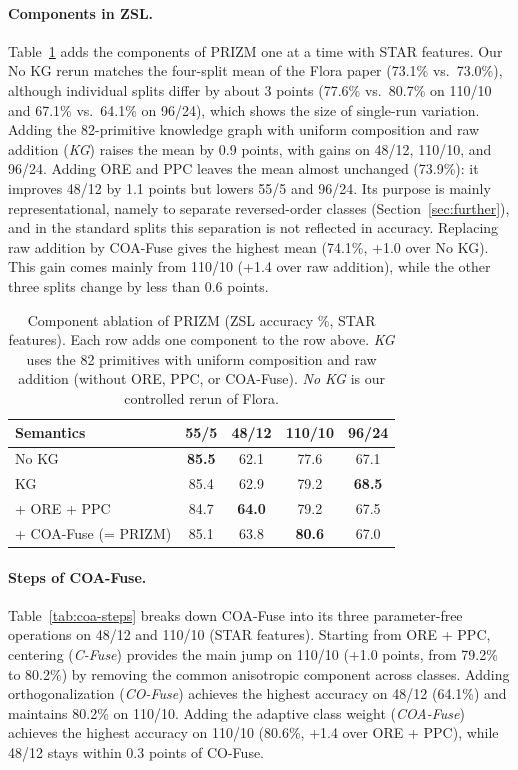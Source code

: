 \documentclass[11pt]{article}
\begin{document}
\paragraph{Components in ZSL.}
Table~\ref{tab:components} adds the components of PRIZM one at a time with STAR features. Our No KG rerun matches the four-split mean of the Flora paper (73.1\% vs.\ 73.0\%), although individual splits differ by about 3 points (77.6\% vs.\ 80.7\% on 110/10 and 67.1\% vs.\ 64.1\% on 96/24), which shows the size of single-run variation. Adding the 82-primitive knowledge graph with uniform composition and raw addition (\emph{KG}) raises the mean by 0.9 points, with gains on 48/12, 110/10, and 96/24. Adding ORE and PPC leaves the mean almost unchanged (73.9\%): it improves 48/12 by 1.1 points but lowers 55/5 and 96/24. Its purpose is mainly representational, namely to separate reversed-order classes (Section~\ref{sec:further}), and in the standard splits this separation is not reflected in accuracy. Replacing raw addition by COA-Fuse gives the highest mean (74.1\%, +1.0 over No KG). This gain comes mainly from 110/10 (+1.4 over raw addition), while the other three splits change by less than 0.6 points.

\begin{table}[htbp]
\centering
\caption{Component ablation of PRIZM (ZSL accuracy \%, STAR features). Each row adds one component to the row above. \emph{KG} uses the 82 primitives with uniform composition and raw addition (without ORE, PPC, or COA-Fuse). \emph{No KG} is our controlled rerun of Flora.}
\label{tab:components}
\small
\begin{tabular}{l|cccc}
\hline
Semantics & 55/5 & 48/12 & 110/10 & 96/24 \\
\hline
No KG & \textbf{85.5} & 62.1 & 77.6 & 67.1 \\
\hline
KG & 85.4 & 62.9 & 79.2 & \textbf{68.5} \\
\quad + ORE + PPC & 84.7 & \textbf{64.0} & 79.2 & 67.5 \\
\quad + COA-Fuse (= PRIZM) & 85.1 & 63.8 & \textbf{80.6} & 67.0 \\
\hline
\end{tabular}
\end{table}

\paragraph{Steps of COA-Fuse.}
Table~\ref{tab:coa-steps} breaks down COA-Fuse into its three parameter-free operations on 48/12 and 110/10 (STAR features). Starting from ORE + PPC, centering (\emph{C-Fuse}) provides the main jump on 110/10 (+1.0 points, from 79.2\% to 80.2\%) by removing the common anisotropic component across classes. Adding orthogonalization (\emph{CO-Fuse}) achieves the highest accuracy on 48/12 (64.1\%) and maintains 80.2\% on 110/10. Adding the adaptive class weight (\emph{COA-Fuse}) achieves the highest accuracy on 110/10 (80.6\%, +1.4 over ORE + PPC), while 48/12 stays within 0.3 points of CO-Fuse.
\end{document}
